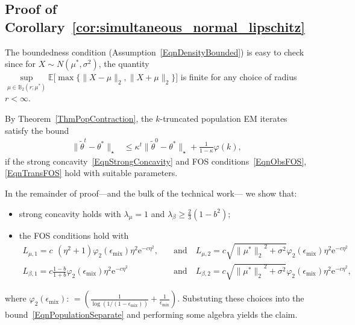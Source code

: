\documentclass[twoside,11pt]{article}
\def\EE{ \mathbb{E} }
\def\E{ \mathrm{e} }							%
\newcommand{\norm}[1]{\ensuremath{\|#1\|_2}}
\newcommand{\mixcoefeps}{\ensuremath{\epsilon_{\mathrm{mix}}}}
\newcommand{\mixcoefbound}{\ensuremath{b}}
\newcommand{\paramobs}{\mu}
\newcommand{\trueparamobs}{\ensuremath{\paramobs^*}}
\newcommand{\paramtrans}{\beta}
\newcommand{\paramjoint}{\theta}
\newcommand{\paramjointtil}{\widetilde{\theta}}
\newcommand{\trueparamjoint}{\paramjoint^*}
\newcommand{\addnorm}[1]{\| #1 \|_{\star}}
\newcommand{\SNR}{\eta^2}
\newcommand{\factormixing}{\varphi_2(\mixcoefeps)}
\newcommand{\defn}{: \, = }
\newcommand{\Ball}{\ensuremath{\mathbb{B}}}
\newcommand{\rad}{\ensuremath{r}}
\newcommand{\kdim}{\ensuremath{k}}
\newcommand{\BOUNDFUN}{\ensuremath{\varphi}}
\newcommand{\constant}{\ensuremath{c}}
\newcommand{\plaincon}{\ensuremath{c}}
\begin{document}

\subsection{Proof of Corollary~\ref{cor:simultaneous_normal_lipschitz}}
\label{SecProofCorOne}

The boundedness condition (Assumption~\eqref{EqnDensityBounded}) is
easy to check since for $X \sim N(\trueparamobs, \sigma^2)$, the
quantity $\sup \limits_{\paramobs \in \Ball_2(r; \trueparamobs)} \EE
\big[ \max\{ \|X - \mu\|_2, \|X + \mu\|_2 \} \big]$ is finite for any
choice of radius $\rad < \infty$.

By Theorem~\ref{ThmPopContraction}, the $k$-truncated population EM
iterates satisfy the bound
\begin{align}
\label{EqnPopulationSeparate}
\addnorm{\paramjointtil^t -\trueparamjoint} & \leq \kappa^t \addnorm{
\paramjointtil^0 - \trueparamjoint} + \frac{1}{1-\kappa}
\BOUNDFUN(\kdim),
\end{align}
if the strong concavity~\eqref{EqnStrongConcavity} and FOS
conditions~\eqref{EqnObsFOS}, \eqref{EqnTransFOS} hold with suitable
parameters.

In the remainder of proof---and the bulk of the technical work--- we
show that:
\begin{itemize}
\item strong concavity holds with $\lambda_\paramobs = 1$ and
  $\lambda_\paramtrans \geq \frac{2}{3}( 1 - \mixcoefbound^2)$;
%
\item the FOS conditions hold with
\begin{align*}
L_{\paramobs,1} = \constant \,  \: 
(\SNR+1)\factormixing \SNR \E^{-c \SNR}, & \quad \mbox{and} \quad
L_{\paramobs,2} = \plaincon \sqrt{\norm{\trueparamobs}^2+\sigma^2}\factormixing
\SNR \E^{-c\SNR} \\
%
L_{\paramtrans,1} = \plaincon \frac{1-b}{1+b} \factormixing \SNR
\E^{-c \SNR} & \quad \mbox{and} \quad L_{\paramtrans,2} = c
\sqrt{\norm{\trueparamobs}^2+\sigma^2}\factormixing \SNR \E^{-c\SNR},
\end{align*}
\end{itemize}
where $\factormixing \defn
\left(\frac{1}{\log(1/(1-\mixcoefeps))} +
\frac{1}{\mixcoefeps}\right)$.
Substuting these choices into the
bound~\eqref{EqnPopulationSeparate} and performing some algebra yields
the claim.



\end{document}
